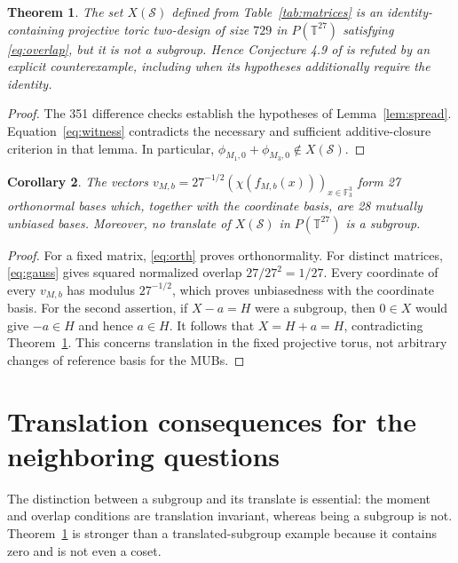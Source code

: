 \documentclass[11pt]{article}
\newtheorem{theorem}{Theorem}
\newtheorem{corollary}[theorem]{Corollary}
\newcommand{\F}{\mathbb F}
\newcommand{\T}{\mathbb T}
\newcommand{\Sset}{\mathcal S}
\begin{document}
\begin{theorem}\label{thm:main}
The set $X(\Sset)$ defined from Table~\ref{tab:matrices} is an identity-containing projective toric two-design of size $729$ in $P(\T^{27})$ satisfying \eqref{eq:overlap}, but it is not a subgroup. Hence Conjecture 4.9 of \cite{iosue} is refuted by an explicit counterexample, including when its hypotheses additionally require the identity.
\end{theorem}
\begin{proof}
The 351 difference checks establish the hypotheses of Lemma~\ref{lem:spread}. Equation~\eqref{eq:witness} contradicts the necessary and sufficient additive-closure criterion in that lemma. In particular, $\phi_{M_1,0}+\phi_{M_3,0}\notin X(\Sset)$.
\end{proof}

\begin{corollary}\label{cor:consequences}
The vectors $v_{M,b}=27^{-1/2}(\chi(f_{M,b}(x)))_{x\in\F_3^3}$ form 27 orthonormal bases which, together with the coordinate basis, are 28 mutually unbiased bases. Moreover, no translate of $X(\Sset)$ in $P(\T^{27})$ is a subgroup.
\end{corollary}
\begin{proof}
For a fixed matrix, \eqref{eq:orth} proves orthonormality. For distinct matrices, \eqref{eq:gauss} gives squared normalized overlap $27/27^2=1/27$. Every coordinate of every $v_{M,b}$ has modulus $27^{-1/2}$, which proves unbiasedness with the coordinate basis. For the second assertion, if $X-a=H$ were a subgroup, then $0\in X$ would give $-a\in H$ and hence $a\in H$. It follows that $X=H+a=H$, contradicting Theorem~\ref{thm:main}. This concerns translation in the fixed projective torus, not arbitrary changes of reference basis for the MUBs.
\end{proof}

\section{Translation consequences for the neighboring questions}
The distinction between a subgroup and its translate is essential: the moment and overlap conditions are translation invariant, whereas being a subgroup is not. Theorem~\ref{thm:main} is stronger than a translated-subgroup example because it contains zero and is not even a coset.
\end{document}
